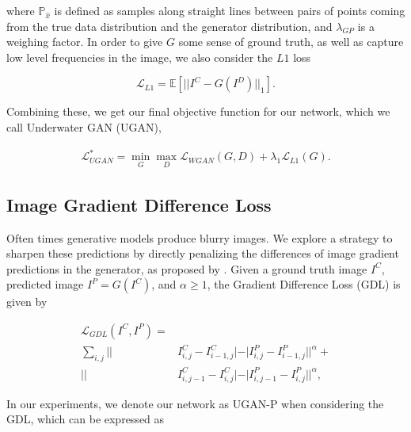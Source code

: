 \documentclass[letterpaper, 10pt, conference]{ieeeconf}
\begin{document}
\noindent where $\mathbb{P}_{\hat{x}}$ is defined as samples along straight lines between pairs of points coming from
the true data distribution and the generator distribution, and $\lambda_{GP}$ is a weighing factor. In order to give $G$
some sense of ground truth, as well as capture low level frequencies in the image, we also consider the $L1$ loss

\begin{equation}
   \mathcal{L}_{L1} = \mathbb{E} [ || I^C - G(I^D) ||_1 ].
\end{equation}

\noindent Combining these, we get our final objective function for our network, which we call Underwater GAN (UGAN),

\begin{equation}
   \begin{aligned}
      \mathcal{L}_{UGAN}^* = \min\limits_{G}\max\limits_{D} \mathcal{L}_{WGAN}(G,D) + \lambda_{1} \mathcal{L}_{L1}(G).
   \end{aligned}
\end{equation}


\subsection{Image Gradient Difference Loss}
Often times generative models produce blurry images. We explore a strategy to sharpen these predictions by
directly penalizing the differences of image gradient predictions in the generator, as proposed by
\cite{mathieu2015deep}. Given a ground truth image $I^C$, predicted image $I^P = G(I^C)$, and $\alpha \geq 1$, the
Gradient Difference Loss (GDL) is given by

\begin{equation}
   \begin{aligned}
      \mathcal{L}_{GDL}(I^C, I^P) = \\ \sum\limits_{i,j} || & I^C_{i,j} - I^C_{i-1,j}| - | I^P_{i,j} - I^P_{i-1,j}||^{\alpha} + \\
      || & I^C_{i,j-1} - I^C_{i,j}| - | I^P_{i,j-1} - I^P_{i,j}||^{\alpha},
   \end{aligned}
\end{equation}

\noindent In our experiments, we denote our network as UGAN-P when considering the GDL, which can be expressed as
\end{document}
